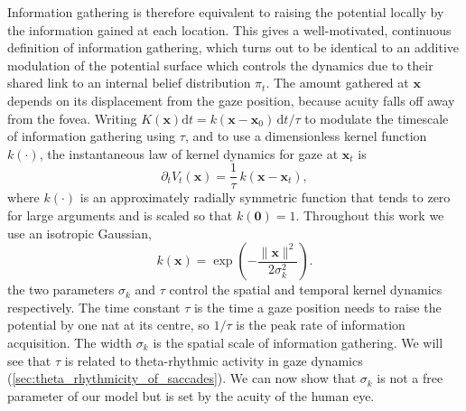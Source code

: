 Information gathering is therefore equivalent to raising the potential locally by the information gained at each location. This gives a well-motivated, continuous definition of information gathering, which turns out to be identical to an additive modulation of the potential surface which controls the dynamics due to their shared link to an internal belief distribution $\pi_t$. The amount gathered at $\mathbf{x}$ depends on its displacement from the gaze position, because acuity falls off away from the fovea. Writing $K(\mathbf{x}) \mathrm{d}t = k(\mathbf{x}-\mathbf{x}_0)\,\mathrm{d}t/\tau$ to modulate the timescale of information gathering using $\tau$, and to use a dimensionless kernel function $k(\cdot)$, the instantaneous law of kernel dynamics for gaze at $\mathbf{x}_t$ is
\begin{equation}\label{eq:kernel_law}
    \partial_t V_{t}(\mathbf{x}) = \frac{1}{\tau}\,k(\mathbf{x} - \mathbf{x}_t),
\end{equation}
where $k(\cdot)$ is an approximately radially symmetric function that tends to zero for large arguments and is scaled so that $k(\mathbf{0})=1$. Throughout this work we use an isotropic Gaussian,
\begin{equation}\label{eq:gaussian_kernel}
    k(\mathbf{x}) = \exp\left( -\frac{\|\mathbf{x}\|^2}{2\sigma_k^2} \right).
\end{equation}
the two parameters $\sigma_k$ and $\tau$ control the spatial and temporal kernel dynamics respectively. The time constant $\tau$ is the time a gaze position needs to raise the potential by one nat at its centre, so $1/\tau$ is the peak rate of information acquisition. The width $\sigma_k$ is the spatial scale of information gathering. We will see that $\tau$ is related to theta-rhythmic activity in gaze dynamics (\cref{sec:theta_rhythmicity_of_saccades}). We can now show that $\sigma_k$ is not a free parameter of our model but is set by the acuity of the human eye.

